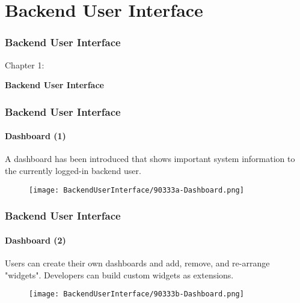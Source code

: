 %

\section{Backend User Interface}
\begin{frame}[fragile]
	\frametitle{Backend User Interface}

	\begin{center}\huge{Chapter 1:}\end{center}
	\begin{center}\huge{\color{typo3darkgrey}\textbf{Backend User Interface}}\end{center}

\end{frame}


\begin{frame}[fragile]
	\frametitle{Backend User Interface}
	\framesubtitle{Dashboard (1)}

	A dashboard has been introduced that shows important system information to the currently logged-in backend user.

	\begin{figure}
		\texttt{[image: BackendUserInterface/90333a-Dashboard.png]}
	\end{figure}

\end{frame}


\begin{frame}[fragile]
	\frametitle{Backend User Interface}
	\framesubtitle{Dashboard (2)}

	Users can create their own dashboards and add, remove, and re-arrange "widgets".
	Developers can build custom widgets as extensions.

	\begin{figure}
		\texttt{[image: BackendUserInterface/90333b-Dashboard.png]}
	\end{figure}

\end{frame}

